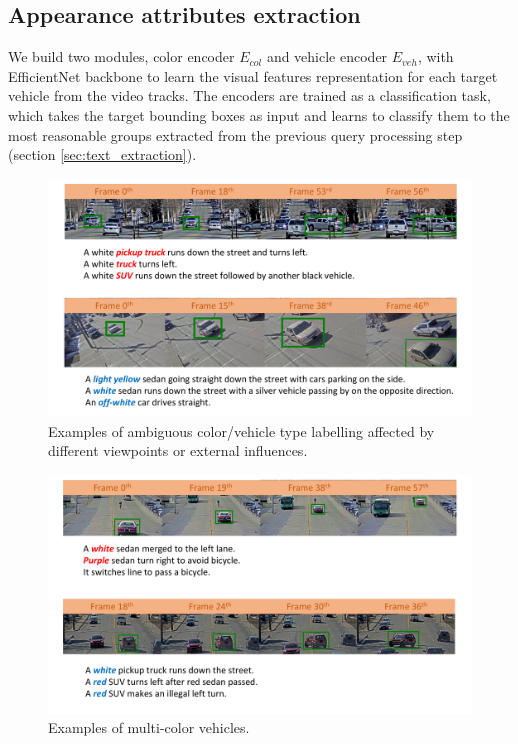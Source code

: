 \subsection{Appearance attributes extraction}
\label{sec:vehcol_extraction}
We build two modules, color encoder $E_{col}$ and vehicle encoder $E_{veh}$, with EfficientNet \cite{tan2019efficientnet} backbone to learn the visual features representation for each target vehicle from the video tracks.
The encoders are trained as a classification task, which takes the target bounding boxes as input and learns to classify them to the most reasonable groups extracted from the previous query processing step (section \ref{sec:text_extraction}). \\
\begin{figure}[!h]
    \centering
    \includegraphics[width=\textwidth]{images/methods/hard_classification.pdf}
    \caption{Examples of ambiguous color/vehicle type labelling affected by different viewpoints or external influences.}
    \label{fig:hard_color}
\end{figure}
\begin{figure}[!h]
    \centering
    \includegraphics[width=\textwidth]{images/methods/multicolor_example.pdf}
    \caption{Examples of multi-color vehicles.}
    \label{fig:multicolor}
\end{figure}
